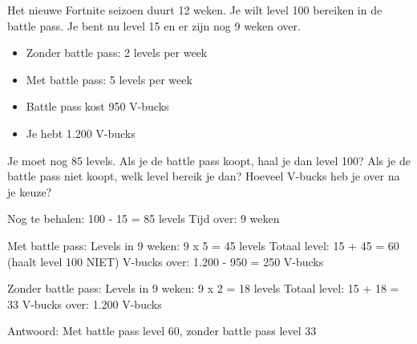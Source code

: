 \begin{opgave}
Het nieuwe Fortnite seizoen duurt 12 weken. Je wilt level 100 bereiken in de
battle pass. Je bent nu level 15 en er zijn nog 9 weken over.

\begin{itemize}
\item Zonder battle pass: 2 levels per week
\item Met battle pass: 5 levels per week
\item Battle pass kost 950 V-bucks
\item Je hebt 1.200 V-bucks
\end{itemize}

Je moet nog 85 levels. Als je de battle pass koopt, haal je dan level 100?
Als je de battle pass niet koopt, welk level bereik je dan? Hoeveel V-bucks
heb je over na je keuze?
\end{opgave}

\begin{oplossing}
Nog te behalen: 100 - 15 = 85 levels
Tijd over: 9 weken

Met battle pass:
Levels in 9 weken: 9 x 5 = 45 levels
Totaal level: 15 + 45 = 60 (haalt level 100 NIET)
V-bucks over: 1.200 - 950 = 250 V-bucks

Zonder battle pass:
Levels in 9 weken: 9 x 2 = 18 levels  
Totaal level: 15 + 18 = 33
V-bucks over: 1.200 V-bucks

Antwoord: Met battle pass level 60, zonder battle pass level 33
\end{oplossing}